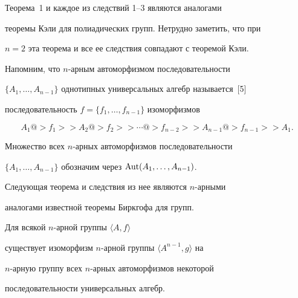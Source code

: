 Теорема~1 и каждое из следствий 1--3 являются аналогами


теоремы Кэли для полиадических групп. Нетрудно заметить, что при


$n=2$ эта теорема и все ее следствия совпадают с теоремой Кэли.





Напомним, что $n$-арным автоморфизмом последовательности


$\{A_1,\dotsc,A_{n-1}\}$ однотипных универсальных алгебр называется~[5]


последовательность $f = \{f_1,\dotsc, f_{n-1}\}$ изоморфизмов


$$


A_1@>{f_1}>> A_2 @>{f_2}>> \dotsb


@>{f_{n-2}}>> A_{n-1} @>{f_{n-1}}>> A_1.


$$


Множество всех $n$-арных автоморфизмов последовательности


$\{A_1,\dotsc,A_{n-1}\}$ обозначим через $\operatorname{Aut}(A_1,\dotsc, A_{n-1})$.





Следующая теорема и следствия из нее являются $n$-арными


аналогами известной теоремы Биркгофа для групп.





\begin{thm}


Для всякой $n$-арной группы $\langle A,f\rangle $


существует изоморфизм $n$-арной группы $\langle A^{n-1},g\rangle $ на


$n$-арную группу всех $n$-арных автоморфизмов некоторой


последовательности универсальных алгебр.


\end{thm}





